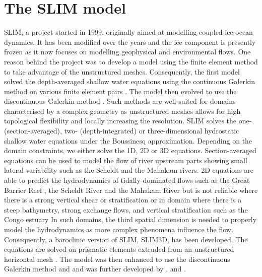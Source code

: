 \section{The SLIM model}
SLIM, a project started in 1999, originally aimed at modelling coupled ice-ocean dynamics. It has been modified over the years and the ice component is presently frozen as it now focuses on modelling geophysical and environmental flows. One reason behind the project was to develop a model using the finite element method to take advantage of the unstructured meshes. Consequently, the first model solved the depth-averaged shallow water equations using the continuous Galerkin method on various finite element pairs \citep{hanert2003comparison,leroux2005some}. The model then evolved to use the discontinuous Galerkin method \citep{lambrechts2008multiscale}. Such methods are well-suited for domains characterised by a complex geometry as unstructured meshes allows for high topological flexibility and locally increasing the resolution. SLIM solves the one- (section-averaged), two- (depth-integrated) or three-dimensional hydrostatic shallow water equations under the Boussinesq approximation. Depending on the domain constraints, we either solve the 1D, 2D or 3D equations. Section-averaged equations can be used to model the flow of river upstream parts showing small lateral variability such as the Scheldt \citep{gourgue2009flux,debrye2010finite, debrauwere2011residence,debrye2012water} and the Mahakam \citep{debrye2011preliminary,van2016simulations} rivers. 2D equations are able to predict the hydrodynamics of tidally-dominated flows such as the Great Barrier Reef \citep{lambrechts2008multi,thomas2014numerical, delandmeter2017submesoscale}, the Scheldt River and the Mahakam River but is not reliable where there is a strong vertical shear or stratification \citep{delandmeter2015transport} or in domain where there is a steep bathymetry, strong exchange flows, and vertical stratification such as the Congo estuary \citep{lebars2016unstructured,vallaeys2018thesis,vallaeys2018discontinuous}
In such domains, the third spatial dimension is needed to properly model the hydrodynamics as more complex phenomena influence the flow. Consequently, a baroclinic version of SLIM, SLIM3D, has been developed. The equations are solved on prismatic elements extruded from an unstructured horizontal mesh \citep{white2008three,white2008tracer}. The model was then enhanced to use the discontinuous Galerkin method \citep{comblen2010discontinuous} and \citep{blaise2010discontinuous} and was further developed by \citet{karna2013baroclinic}, \citet{delandmeter2018fully} and \citet{vallaeys2018thesis}.

